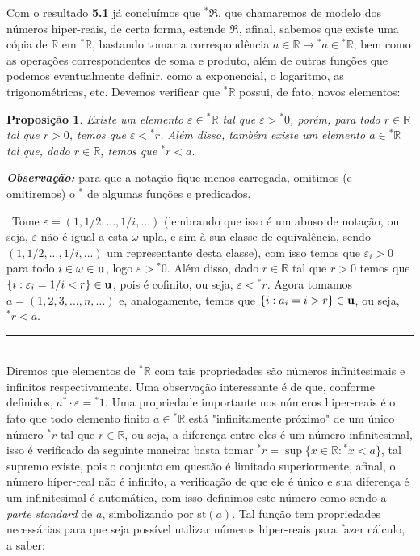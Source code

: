 \documentclass[11pt,a4paper]{article}
\newtheorem{prop}[mydef]{Proposição}
\def\dem{\par\smallbreak\noindent {\textit{ Demonstração:}} \ }
\def\eop{\hfill\rule{2.5mm}{2.5mm} \\ }
\theoremstyle{definition}
\begin{document}
Com o resultado \textbf{5.1} já concluímos que $^*\mathfrak{R}$, que chamaremos de modelo dos números hiper-reais, de certa forma, estende $\mathfrak{R}$, afinal, sabemos que existe uma cópia de $\mathbb{R}$ em $^*\mathbb{R}$, bastando tomar a correspondência $a\in \mathbb{R}\mapsto {^*a}\in {^*\mathbb{R}}$, bem como as operações correspondentes de soma e produto, além de outras funções que podemos eventualmente definir, como a exponencial, o logaritmo, as trigonométricas, etc. Devemos verificar que ${^*\mathbb{R}}$ possui, de fato, novos elementos:

\begin{prop}
	
	Existe um elemento $\varepsilon \in {^*\mathbb{R}}$ tal que $\varepsilon > {^*0}$, porém, para todo $r\in \mathbb{R}$ tal que $r>0$, temos que $\varepsilon < {^*r}$. Além disso, também existe um elemento $a\in {^*\mathbb{R}}$ tal que, dado $r\in \mathbb{R}$, temos que $^*r<a$.  
	
	
\end{prop}



\textbf{\textit{Observação:}} para que a notação fique menos carregada, omitimos (e omitiremos) o $^*$ de algumas funções e predicados.


\dem Tome $\varepsilon = (1,1/2,...,1/i,...)$ (lembrando que isso é um abuso de notação, ou seja, $\varepsilon$ não é igual a esta $\omega$-upla, e sim à sua classe de equivalência, sendo $(1,1/2,...,1/i,...)$ um representante desta classe), com isso temos que $\varepsilon_i > 0$ para todo $i\in \omega\in \bf{u}$, logo $\varepsilon > {^*0}$. Além disso, dado $r\in \mathbb{R}$ tal que $r>0$ temos que $\{i: \varepsilon_i=1/i < r\}\in \bf{u}$, pois é cofinito, ou seja,  $\varepsilon < {^*r}$. Agora tomamos $a=(1,2,3,...,n,...)$ e, analogamente, temos que  $\{i: a_i=i > r\}\in \bf{u}$, ou seja, $^*r<a$. \eop

Diremos que elementos de ${^*\mathbb{R}}$ com tais propriedades são números infinitesimais e infinitos respectivamente. Uma observação interessante é de que, conforme definidos, $a {^*\cdot} \varepsilon = {^*1}$. Uma propriedade importante nos números hiper-reais é o fato que todo elemento finito $a\in {^*\mathbb{R}}$ está "infinitamente próximo" de um único número $^*r$ tal que $r\in \mathbb{R}$, ou seja, a diferença entre eles é um número infinitesimal, isso é verificado da seguinte maneira: basta tomar $^*r=\sup \{ x\in \mathbb{R}: {^*x} < a \}$, tal supremo existe, pois o conjunto em questão é limitado superiormente, afinal, o número híper-real não é infinito, a verificação de que ele é único e sua diferença é um infinitesimal é automática, com isso definimos este número como sendo a \textit{parte standard} de $a$, simbolizando por $\text{st}(a)$. Tal função tem propriedades necessárias para que seja possível utilizar números hiper-reais para fazer cálculo, a saber: 
\end{document}
